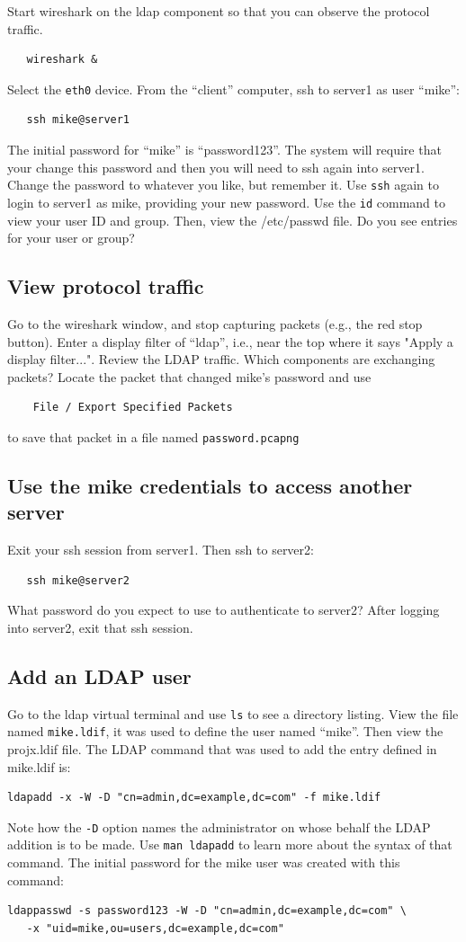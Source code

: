Start wireshark on the ldap component so that you can observe the protocol traffic.
\begin{verbatim}
   wireshark &
\end{verbatim}
\noindent Select the {\tt eth0} device.
From the ``client'' computer, ssh to server1 as user ``mike'':
\begin{verbatim}
   ssh mike@server1
\end{verbatim}
The initial password for ``mike'' is ``password123''.  The system will require that
your change this password and then you will need to ssh again into server1.  Change
the password to whatever you like, but remember it. Use {\tt ssh} again to login to server1
as mike, providing your new password. Use the {\tt id} command to view your user ID
and group. Then,  view the /etc/passwd file.  Do you see entries
for your user or group?

\subsection{View protocol traffic}
Go to the wireshark window, and stop capturing packets (e.g., the red stop button).
Enter a display filter of ``ldap'', i.e., near the top where it says "Apply a display filter...".
Review the LDAP traffic.  Which components are exchanging packets?  Locate the packet that changed
mike's password and use 
\begin{verbatim}
    File / Export Specified Packets 
\end{verbatim}
\noindent to save that packet in a file named {\tt password.pcapng}

\subsection{Use the mike credentials to access another server}
Exit your ssh session from server1.  Then ssh to server2:
\begin{verbatim}
   ssh mike@server2
\end{verbatim}
\noindent What password do you expect to use to authenticate to server2?
After logging into server2, exit that ssh session.

\subsection{Add an LDAP user}
Go to the ldap virtual terminal and use {\tt ls} to see a directory listing.
View the file named {\tt mike.ldif}, it was used to define the user named ``mike''.
Then view the projx.ldif file.
The LDAP command that was used to add the entry defined in mike.ldif is:
\begin{verbatim}
ldapadd -x -W -D "cn=admin,dc=example,dc=com" -f mike.ldif
\end{verbatim}
\noindent Note how the {\tt -D} option names the administrator on whose behalf the
LDAP addition is to be made.  Use {\tt man ldapadd} to learn more about the syntax of
that command. 
The initial password for the mike user was created with this command:
\begin{verbatim}
ldappasswd -s password123 -W -D "cn=admin,dc=example,dc=com" \
   -x "uid=mike,ou=users,dc=example,dc=com"
\end{verbatim}

